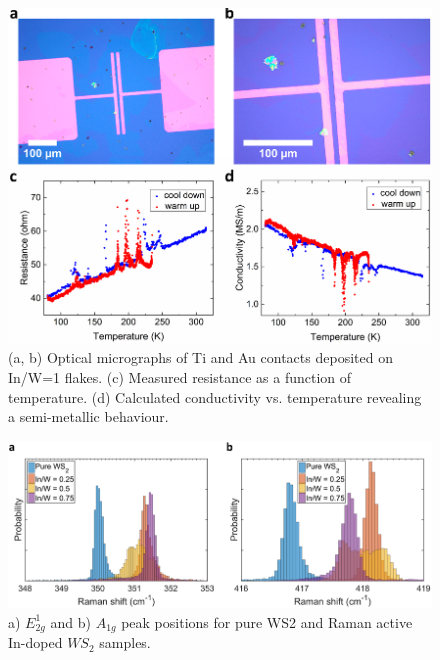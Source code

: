 \begin{figure}[!h]
	\begin{center}
		\includegraphics[scale=0.5]{In/ElectricalMeasurements.png}
		\caption{(a, b) Optical micrographs of Ti and Au contacts deposited on In/W=1 flakes. (c) Measured resistance as a function of temperature. (d) Calculated conductivity vs. temperature revealing a semi-metallic behaviour.}
		\label{fig:InElectricalMeasurement}
	\end{center}
\end{figure}

\newpage
\begin{figure}[!h]
	\begin{center}
		\includegraphics[scale=0.5]{In/RamanPositionHistogram.png}
		\caption{a) $E^1_{2g}$ and b) $A_{1g}$ peak positions for pure WS2 and Raman active In-doped $WS_2$ samples.}
		\label{fig:InRamanPLHistogram}
	\end{center}
\end{figure}

